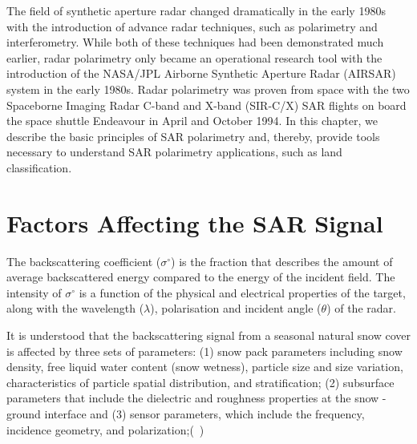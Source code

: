 The field of synthetic aperture radar changed dramatically in the early 1980s with the introduction of advance radar techniques, such as polarimetry and interferometry. While both of these techniques had been demonstrated much earlier, radar polarimetry only became an operational research tool with the introduction of the NASA/JPL Airborne Synthetic Aperture Radar (AIRSAR) system in the early 1980s. Radar polarimetry was proven from space with the two Spaceborne Imaging Radar C-band and X-band (SIR-C/X) SAR flights on board the space shuttle Endeavour in April and October 1994. In this chapter, we describe the basic principles of SAR polarimetry and, thereby, provide tools necessary to understand SAR polarimetry applications, such as land classification.

\section{Factors Affecting the SAR Signal}
The backscattering coefficient ($\sigma$$^\circ$) is the fraction that describes the amount of average backscattered energy compared to the energy of the incident field. The intensity of $\sigma$$^\circ$ is a function of the physical and electrical properties of the target, along with the wavelength ($\lambda$), polarisation and incident angle ($\theta$) of the radar. 

It is understood that the backscattering signal from a seasonal natural snow cover is affected by three sets of parameters: (1) snow pack parameters including snow density, free liquid water content (snow wetness), particle size and size variation, characteristics of particle spatial distribution, and stratification; (2) subsurface parameters that include the dielectric and roughness properties at the snow - ground interface and (3) sensor parameters, which include the frequency, incidence geometry, and polarization;(~\cite{shi1992radar}) 

